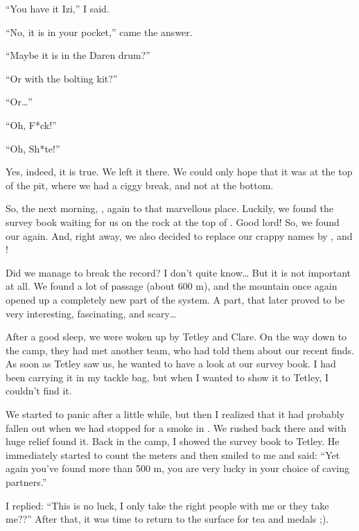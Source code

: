 ``You have it Izi,'' I said.

``No, it is in your pocket,'' came the answer.

``Maybe it is in the Daren drum?''

``Or with the bolting kit?''

``Or\ldots{}''

``Oh, F*ck!''

``Oh, Sh*te!''

Yes, indeed, it is true. We left it there. We could only hope that it was at the top of the pit, where we had a ciggy break, and not at the bottom.

So, the next morning, , again to
that marvellous place. Luckily, we found the survey book waiting for us
on the rock at the top of . Good lord! So, we found our
 again. And, right away, we also decided to replace our
crappy names by , and !

Did we manage to break the record? I don't quite know\ldots{} But it is
not important at all. We found a lot of passage (about 600 m), and the
mountain once again opened up a completely new part of the system. A
part, that later proved to be very interesting, fascinating, and
scary\ldots{}



After a good sleep, we were woken up by Tetley and Clare. On the way down to the camp, they had met another team, who had told them about our recent finds. As soon as Tetley saw us, he wanted to have a look at our survey book. I had been carrying it in my tackle bag, but when I wanted to show it to Tetley, I couldn't find it.

We started to panic after a little while, but then I realized that it had probably fallen out when we had stopped for a smoke in . We rushed back there and with huge relief found it. Back in the camp, I showed the survey book to Tetley. He immediately started to count the meters and then smiled to me and said: ``Yet again you've found more than 500 m, you are very lucky in your choice of caving partners.''

I replied: ``This is no luck, I only take the right people with me or they take me??'' After that, it was time to return to the surface for tea and medals ;).



